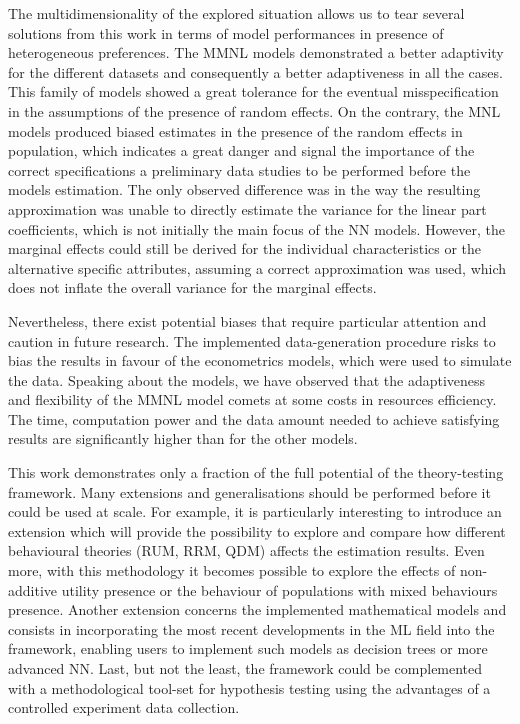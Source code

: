 \documentclass[11pt,]{article}
\begin{document}
The multidimensionality of the explored situation allows us to tear
several solutions from this work in terms of model performances in
presence of heterogeneous preferences. The MMNL models demonstrated a
better adaptivity for the different datasets and consequently a better
adaptiveness in all the cases. This family of models showed a great
tolerance for the eventual misspecification in the assumptions of the
presence of random effects. On the contrary, the MNL models produced
biased estimates in the presence of the random effects in population,
which indicates a great danger and signal the importance of the correct
specifications a preliminary data studies to be performed before the
models estimation. The only observed difference was in the way the
resulting approximation was unable to directly estimate the variance for
the linear part coefficients, which is not initially the main focus of
the NN models. However, the marginal effects could still be derived for
the individual characteristics or the alternative specific attributes,
assuming a correct approximation was used, which does not inflate the
overall variance for the marginal effects.

Nevertheless, there exist potential biases that require particular
attention and caution in future research. The implemented
data-generation procedure risks to bias the results in favour of the
econometrics models, which were used to simulate the data. Speaking
about the models, we have observed that the adaptiveness and flexibility
of the MMNL model comets at some costs in resources efficiency. The
time, computation power and the data amount needed to achieve satisfying
results are significantly higher than for the other models.

This work demonstrates only a fraction of the full potential of the
theory-testing framework. Many extensions and generalisations should be
performed before it could be used at scale. For example, it is
particularly interesting to introduce an extension which will provide
the possibility to explore and compare how different behavioural
theories (RUM, RRM, QDM) affects the estimation results. Even more, with
this methodology it becomes possible to explore the effects of
non-additive utility presence or the behaviour of populations with mixed
behaviours presence. Another extension concerns the implemented
mathematical models and consists in incorporating the most recent
developments in the ML field into the framework, enabling users to
implement such models as decision trees or more advanced NN. Last, but
not the least, the framework could be complemented with a methodological
tool-set for hypothesis testing using the advantages of a controlled
experiment data collection.
\end{document}
